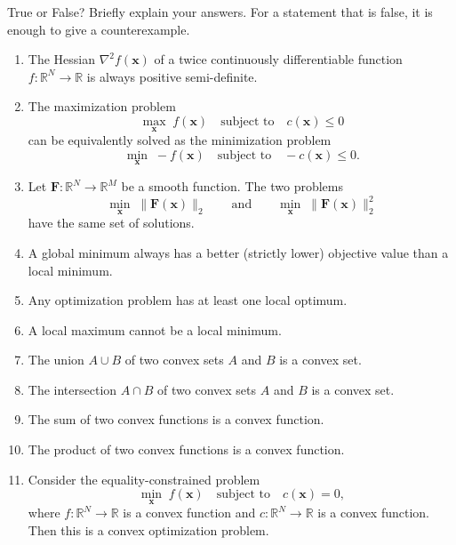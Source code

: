 \begin{exercise} %
    \label{ex:tf-optimization}
    True or False? Briefly explain your answers. For a statement that is false, it is enough to give a counterexample.
    \begin{enumerate}[label=(\alph*)]
        \item  The Hessian $\nabla^2 f(\mathbf{x})$ of a twice continuously differentiable function $f: \mathbb{R}^N \to \mathbb{R}$ is always positive semi-definite.
        \item  The maximization problem
        \[
            \max_{\mathbf{x}} \; f(\mathbf{x}) \quad \text{subject to} \quad c(\mathbf{x}) \le 0
        \]
        can be equivalently solved as the minimization problem
        \[
            \min_{\mathbf{x}} \; -f(\mathbf{x}) \quad \text{subject to} \quad -c(\mathbf{x}) \le 0.
        \]
        \item  Let $\mathbf{F}: \mathbb{R}^N \to \mathbb{R}^M$ be a smooth function. The two problems
        \[
            \min_{\mathbf{x}} \; \|\mathbf{F}(\mathbf{x})\|_2
            \qquad \text{and} \qquad
            \min_{\mathbf{x}} \; \|\mathbf{F}(\mathbf{x})\|_2^2
        \]
        have the same set of solutions.
        \item  A global minimum always has a better (strictly lower) objective value than a local minimum.
        \item  Any optimization problem has at least one local optimum.
        \item  A local maximum cannot be a local minimum.
        \item  The union $A \cup B$ of two convex sets $A$ and $B$ is a convex set.
        \item  The intersection $A \cap B$ of two convex sets $A$ and $B$ is a convex set.
        \item  The sum of two convex functions is a convex function.
        \item  The product of two convex functions is a convex function.
        \item  Consider the equality-constrained problem
        \[
            \min_{\mathbf{x}} \; f(\mathbf{x}) \quad \text{subject to} \quad c(\mathbf{x}) = 0,
        \]
        where $f: \mathbb{R}^N \to \mathbb{R}$ is a convex function and $c: \mathbb{R}^N \to \mathbb{R}$ is a convex function. Then this is a convex optimization problem.

\end{enumerate}
\end{exercise}
